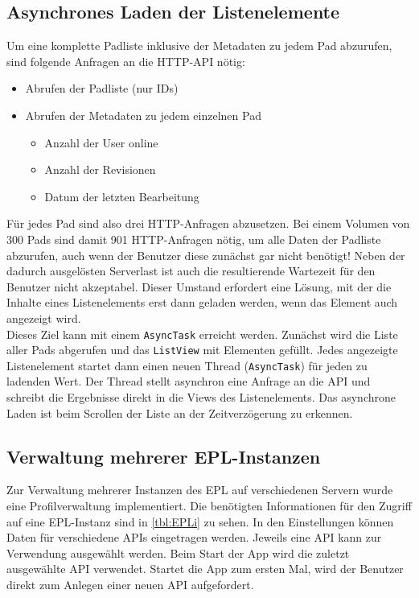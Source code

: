 \subsection{Asynchrones Laden der Listenelemente}
Um eine komplette Padliste inklusive der Metadaten zu jedem Pad abzurufen, sind folgende Anfragen an die HTTP-API nötig:
\begin{itemize}
	\item Abrufen der Padliste (nur IDs)
	\item Abrufen der Metadaten zu jedem einzelnen Pad
		\begin{itemize}
			\item Anzahl der User online
			\item Anzahl der Revisionen
			\item Datum der letzten Bearbeitung
		\end{itemize}
\end{itemize}

Für jedes Pad sind also drei HTTP-Anfragen abzusetzen.
Bei einem Volumen von 300 Pads sind damit 901 HTTP-Anfragen nötig, um alle Daten der Padliste abzurufen, auch wenn der Benutzer diese zunächst gar nicht benötigt!
Neben der dadurch ausgelösten Serverlast ist auch die resultierende Wartezeit für den Benutzer nicht akzeptabel.
Dieser Umstand erfordert eine Lösung, mit der die Inhalte eines Listenelements erst dann geladen werden, wenn das Element auch angezeigt wird.\\
Dieses Ziel kann mit einem \texttt{AsyncTask} erreicht werden.
Zunächst wird die Liste aller Pads abgerufen und das \texttt{ListView} mit Elementen gefüllt. Jedes angezeigte Listenelement startet dann einen neuen Thread (\texttt{AsyncTask}) für jeden zu ladenden Wert.
Der Thread stellt asynchron eine Anfrage an die API und schreibt die Ergebnisse direkt in die Views des Listenelements.
Das asynchrone Laden ist beim Scrollen der Liste an der Zeitverzögerung zu erkennen.

\newpage
\subsection{Verwaltung mehrerer EPL-Instanzen}
\label{sub:implem:eplinstanzen}
Zur Verwaltung mehrerer Instanzen des EPL auf verschiedenen Servern wurde eine Profilverwaltung implementiert.
Die benötigten Informationen für den Zugriff auf eine EPL-Instanz sind in \autoref{tbl:EPLi} zu sehen.
In den Einstellungen können Daten für verschiedene APIs eingetragen werden.
Jeweils eine API kann zur Verwendung ausgewählt werden.
Beim Start der App wird die zuletzt ausgewählte API verwendet.
Startet die App zum ersten Mal, wird der Benutzer direkt zum Anlegen einer neuen API aufgefordert.

